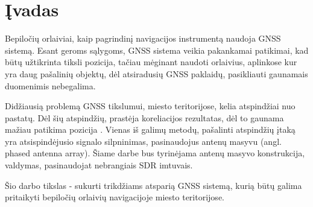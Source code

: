 \documentclass[../gnss_interference_resistant_thesis.tex]{subfiles}
\begin{document}
\section*{Įvadas}

Bepiločių orlaiviai, kaip pagrindinį navigacijos instrumentą naudoja
GNSS sistemą. Esant geroms sąlygoms, GNSS sistema veikia pakankamai
patikimai, kad būtų užtikrinta tiksli pozicija,
tačiau mėginant naudoti orlaivius, aplinkose kur yra daug
pašalinių objektų, dėl atsiradusių GNSS paklaidų, pasikliauti gaunamais
duomenimis nebegalima.

Didžiausią problemą GNSS tikslumui, miesto teritorijose, kelia
atspindžiai nuo pastatų. Dėl šių atspindžių, prastėja
koreliacijos rezultatas, dėl to gaunama mažiau patikima
pozicija \cite{Vagle2016}. Vienas iš galimų metodų,
pašalinti atspindžių įtaką yra atsispindėjusio signalo
silpninimas, pasinaudojus antenų masyvu (angl. phased antenna array).
Šiame darbe bus tyrinėjama antenų masyvo konstrukcija,
valdymas, pasinaudojat nebrangiais SDR imtuvais.

Šio darbo tikslas - sukurti trikdžiams atsparią GNSS sistemą,
kurią būtų galima pritaikyti bepiločių orlaivių navigacijoje miesto
teritorijose.
\end{document}
